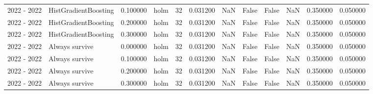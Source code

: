 \begin{tabular}{llrlrrrrrrrr}
2022 - 2022 & HistGradientBoosting & 0.100000 & holm & 32 & 0.031200 & NaN & False & False & NaN & 0.350000 & 0.050000 \\
2022 - 2022 & HistGradientBoosting & 0.200000 & holm & 32 & 0.031200 & NaN & False & False & NaN & 0.350000 & 0.050000 \\
2022 - 2022 & HistGradientBoosting & 0.300000 & holm & 32 & 0.031200 & NaN & False & False & NaN & 0.350000 & 0.050000 \\
2022 - 2022 & Always survive & 0.000000 & holm & 32 & 0.031200 & NaN & False & False & NaN & 0.350000 & 0.050000 \\
2022 - 2022 & Always survive & 0.100000 & holm & 32 & 0.031200 & NaN & False & False & NaN & 0.350000 & 0.050000 \\
2022 - 2022 & Always survive & 0.200000 & holm & 32 & 0.031200 & NaN & False & False & NaN & 0.350000 & 0.050000 \\
2022 - 2022 & Always survive & 0.300000 & holm & 32 & 0.031200 & NaN & False & False & NaN & 0.350000 & 0.050000 \\
\bottomrule
\end{tabular}
